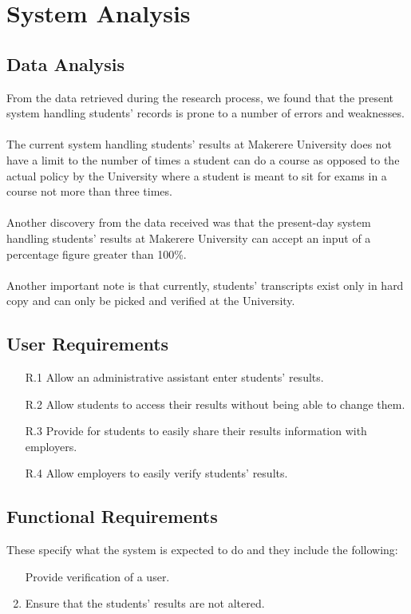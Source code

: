 \newpage
\section{System Analysis}
\subsection{Data Analysis}
From the data retrieved during the research process, we found that the present system handling students’ records is prone to a number of errors and weaknesses.\\\\
The current system handling students’ results at Makerere University does not have a limit to the number of times a student can do a course as opposed to the actual policy by the University where a student is meant to sit for exams in a course not more than three times.\\\\
Another discovery from the data received was that the present-day system handling students’ results at Makerere University can accept an input of a percentage figure greater than 100\%.\\\\
Another important note is that currently, students' transcripts exist only in hard copy and can only be picked and verified at the University.

\subsection{User Requirements}
\begin{enumerate}
\item[R.1] Allow an administrative assistant enter students’ results.
\item[R.2] Allow students to access their results without being able to change them.
\item[R.3] Provide for students to easily share their results information with employers.
\item[R.4] Allow employers to easily verify students' results.
\end{enumerate}

\subsection{Functional Requirements}
These specify what the system is expected to do and they include the following:
\begin{enumerate}
\item[] Provide verification of a user.
\item Ensure that the students’ results are not altered.
\end{enumerate}

